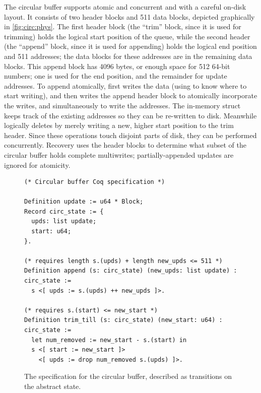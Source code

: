The circular buffer supports atomic and concurrent  and 
with a careful on-disk layout. It consists of two header blocks and 511 data
blocks, depicted graphically in \cref{fig:circ:phys}. The first header block (the ``trim'' block, since it is used for
trimming) holds the logical start position of the queue, while the second header
(the ``append'' block, since it is used for appending) holds the logical end
position and 511 addresses; the data blocks for these addresses are in the
remaining data blocks. This append block has 4096 bytes, or enough space for 512
64-bit numbers; one is used for the end position, and the remainder for update
addresses. To append atomically,  first writes the data
(using  to know where to start writing), and then writes the append
header block to atomically incorporate the writes, and simultaneously to write
the addresses. The in-memory  struct keeps track of the existing
addresses so they can be re-written to disk. Meanwhile  logically
deletes by merely writing a new, higher start position to the trim header. Since
these operations touch disjoint parts of disk, they can be performed
concurrently. Recovery uses the header blocks to determine what subset of the
circular buffer holds complete multiwrites; partially-appended
updates are ignored for atomicity.

\begin{figure}[ht]
\begin{verbatim}
(* Circular buffer Coq specification *)

Definition update := u64 * Block;
Record circ_state := {
  upds: list update;
  start: u64;
}.

(* requires length s.(upds) + length new_upds <= 511 *)
Definition append (s: circ_state) (new_upds: list update) : circ_state :=
  s <[ upds := s.(upds) ++ new_upds ]>.

(* requires s.(start) <= new_start *)
Definition trim_till (s: circ_state) (new_start: u64) : circ_state :=
  let num_removed := new_start - s.(start) in
  s <[ start := new_start ]>
    <[ upds := drop num_removed s.(upds) ]>.
\end{verbatim}
  \caption{The specification for the circular buffer, described as transitions
    on the abstract state.}
  \label{fig:circ:spec}
\end{figure}


